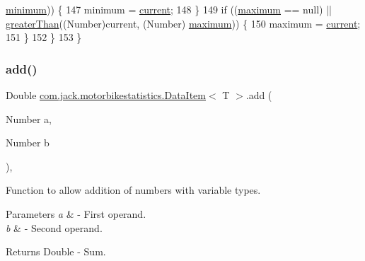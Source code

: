 \begin{DoxyCode}
      \hyperlink{classcom_1_1jack_1_1motorbikestatistics_1_1_data_item_a770342aaa7248e9687517864d73f0009}{minimum})) \{
147                 minimum = \hyperlink{classcom_1_1jack_1_1motorbikestatistics_1_1_data_item_a48cf1c273c44e2181a99d56c48868d1d}{current};
148             \}
149             \textcolor{keywordflow}{if} ((\hyperlink{classcom_1_1jack_1_1motorbikestatistics_1_1_data_item_ac1edb9c63224cebf789b7a2ffd45598f}{maximum} == null) || \hyperlink{classcom_1_1jack_1_1motorbikestatistics_1_1_data_item_a05da757bcb7a824c289a401c8e645264}{greaterThan}((Number)current, (Number)
      \hyperlink{classcom_1_1jack_1_1motorbikestatistics_1_1_data_item_ac1edb9c63224cebf789b7a2ffd45598f}{maximum})) \{
150                 maximum = \hyperlink{classcom_1_1jack_1_1motorbikestatistics_1_1_data_item_a48cf1c273c44e2181a99d56c48868d1d}{current};
151             \}
152         \}
153     \}
\end{DoxyCode}
\mbox{\label{classcom_1_1jack_1_1motorbikestatistics_1_1_data_item_a4a5ad17bfa8a12bc05f6c02de92d6b36}} 
\subsubsection{\texorpdfstring{add()}{add()}}
{\footnotesize\ttfamily Double \hyperlink{classcom_1_1jack_1_1motorbikestatistics_1_1_data_item}{com.\+jack.\+motorbikestatistics.\+Data\+Item}$<$ T $>$.add (\begin{DoxyParamCaption}\item[{Number}]{a,  }\item[{Number}]{b }\end{DoxyParamCaption})\hspace{0.3cm}{\ttfamily [inline]}, {\ttfamily [private]}}



Function to allow addition of numbers with variable types. 


\begin{DoxyParams}{Parameters}
{\em a} & -\/ First operand. \\
\hline
{\em b} & -\/ Second operand. \\
\hline
\end{DoxyParams}
\begin{DoxyReturn}{Returns}
Double -\/ Sum. 
\end{DoxyReturn}


